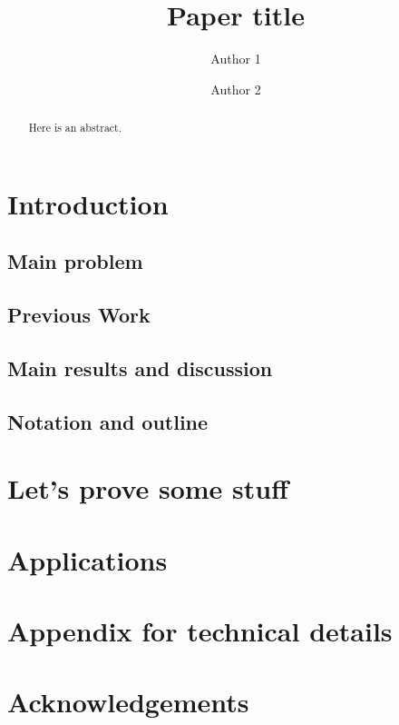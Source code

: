 \documentclass[reqno]{amsart}
\title{Paper title}
\author{Author 1}
\author{Author 2}
\begin{document}
\begin{abstract}
Here is an abstract.
\end{abstract}

\maketitle

\tableofcontents

\section{Introduction}
\subsection{Main problem}
\subsection{Previous Work}
\subsection{Main results and discussion}
\subsection{Notation and outline}

\section{Let's prove some stuff}

\section{Applications}

\appendix
\section{Appendix for technical details}

\section*{Acknowledgements}

\nocite{*}


\end{document}
